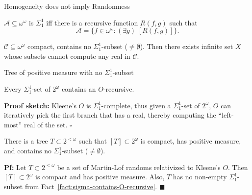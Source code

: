 \begin{frame}{Homogeneity does not imply Randomness}
  \begin{center}
  \end{center}

  \begin{define*}
    $\mathcal{A}\subseteq\omega^\omega$ is $\Sigma_1^1$ iff there is a
    recursive function $R(f,g)$ such that
    \[\mathcal{A} =\{f\in\omega^\omega: (\exists g)\; [R(f,g)]\}.\]
  \end{define*}

  \begin{main-thm*}
    $\mathcal{C}\subseteq\omega^\omega$ compact, contains no
    $\Sigma_1^1$-subset ($\neq\emptyset$). Then there exists infinite set
    $X$ whose subsets cannot compute any real in $\mathcal{C}$.
  \end{main-thm*}
\end{frame}

\begin{frame}{Tree of positive measure with no $\Sigma_1^1$-subset}
  \begin{fact}
    \label{fact:sigma-contains-O-recursive}
    Every $\Sigma_1^1$-set of $2^\omega$ contains an $O$-recursive.
  \end{fact}
  \textbf{Proof sketch:} Kleene's $O$ is $\Sigma_1^1$-complete, thus given a 
  $\Sigma_1^1$-set of $2^\omega$, $O$ can iteratively pick the first branch
  that has a real, thereby computing the ``left-most'' real of the set.
  $\square$

  \vspace{1em}
  \begin{thm}
    There is a tree $T\subset2^{<\omega}$ such that $[T]\subset
    2^\omega$ is compact, has positive measure, and contains no
    $\Sigma_1^1$-subset ($\neq\emptyset$).
  \end{thm}
  \textbf{Pf:} Let $T\subset2^{<\omega}$ be a set of Martin-Lof randoms
  relativized to Kleene's $O$. Then $[T]\subset 2^\omega$ is compact and
  has positive measure. Also, $T$ has no non-empty $\Sigma_1^1$-subset from
  Fact~\ref{fact:sigma-contains-O-recursive}. $\blacksquare$
\end{frame}

